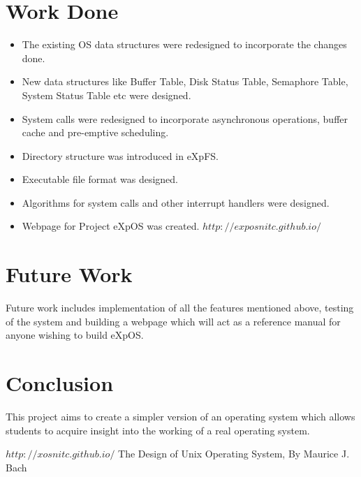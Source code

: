 \documentclass[11pt ,twosided]{article}
\begin{document}
\section{Work Done}
\begin {itemize}
\item The existing OS data structures were redesigned to incorporate the changes done. 
\item New data structures like Buffer Table, Disk Status Table, Semaphore Table, System Status Table etc were designed.
\item System calls were redesigned to incorporate asynchronous operations, buffer cache and pre-emptive scheduling.
\item Directory structure was introduced in eXpFS.
\item Executable file format was designed.
\item Algorithms for system calls and other interrupt handlers were designed.
\item Webpage for Project eXpOS was created. \texttt{$http://exposnitc.github.io/$}
\end{itemize}
 
\section{Future Work}
Future work includes implementation of all the features mentioned above, testing of the system and building a webpage which will act as a reference manual for anyone wishing to build eXpOS.

\section{Conclusion}
This project aims to create a simpler version of an operating system which allows students to acquire insight into the working of a real operating system. 

\begin{thebibliography}{1}
\texttt{$http://xosnitc.github.io/$}
 The Design of Unix Operating System, By Maurice J. Bach
\end{thebibliography}
\end{document}
